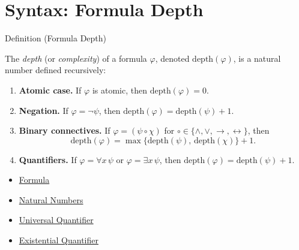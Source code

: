 
\section{Syntax: Formula Depth}


\begin{definitionbox}{Definition (Formula Depth)}
\begin{definition}\label{def:formula-depth}
The \emph{depth} (or \emph{complexity}) of a formula $\varphi$, denoted
$\mathrm{depth}(\varphi)$, is a natural number defined recursively:
\begin{enumerate}
  \item \textbf{Atomic case.} If $\varphi$ is atomic, then $\mathrm{depth}(\varphi) = 0$.

  \item \textbf{Negation.} If $\varphi = \neg \psi$, then
  $\mathrm{depth}(\varphi) = \mathrm{depth}(\psi) + 1$.

  \item \textbf{Binary connectives.} If $\varphi = (\psi \circ \chi)$
  for $\circ \in \{\wedge,\vee,\rightarrow,\leftrightarrow\}$, then
  \[
  \mathrm{depth}(\varphi) = \max\{\mathrm{depth}(\psi),\,\mathrm{depth}(\chi)\} + 1.
  \]

  \item \textbf{Quantifiers.} If $\varphi = \forall x\,\psi$ or $\varphi = \exists x\,\psi$,
  then $\mathrm{depth}(\varphi) = \mathrm{depth}(\psi) + 1$.
\end{enumerate}
\end{definition}
\end{definitionbox}

\begin{dependencies}
\begin{itemize}
  \item \hyperref[def:formula]{Formula}
  \item \hyperref[def:natural-numbers]{Natural Numbers}
  \item \hyperref[def:universal-q]{Universal Quantifier}
  \item \hyperref[def:existential-q]{Existential Quantifier}
\end{itemize}
\end{dependencies}

